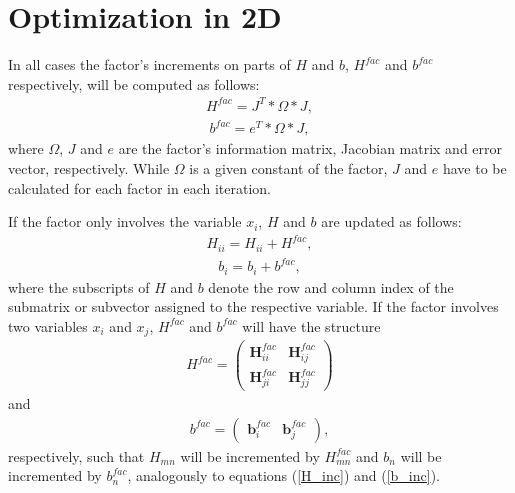\section{Optimization in 2D}



In all cases the factor's increments on parts of $H$ and $b$, $H^{fac}$ and $b^{fac}$ respectively, will be computed as follows:
\begin{align}
	H^{fac} = J^T * \Omega * J,
\end{align}
\begin{align}
	b^{fac} = e^T * \Omega * J,
\end{align}
where $\Omega$, $J$ and $e$ are the factor's information matrix, Jacobian matrix and error vector, respectively. While $\Omega$ is a given constant of the factor, $J$ and $e$ have to be calculated for each factor in each iteration.

If the factor only involves the variable $x_i$, $H$ and $b$ are updated as follows:
\begin{align}
\label{H_inc}
	H_{ii} = H_{ii} + H^{fac},
\end{align}
\begin{align}
\label{b_inc}
	b_i = b_i + b^{fac},
\end{align}
where the subscripts of $H$ and $b$ denote the row and column index of the submatrix or subvector assigned to the respective variable. If the factor involves two variables $x_i$ and $x_j$, $H^{fac}$ and $b^{fac}$ will have the structure
\begin{align}
H^{fac} =
\begin{pmatrix}
	\boldsymbol{H}^{fac}_{ii} & \boldsymbol{H}^{fac}_{ij}\\
	\boldsymbol{H}^{fac}_{ji} & \boldsymbol{H}^{fac}_{jj}
\end{pmatrix}
\end{align}
and
\begin{align}
b^{fac} =
\begin{pmatrix}
	\boldsymbol{b}^{fac}_{i} & \boldsymbol{b}^{fac}_{j}
\end{pmatrix},
\end{align}
respectively, such that $H_{mn}$ will be incremented by $H^{fac}_{mn}$ and $b_n$ will be incremented by $b^{fac}_n$, analogously to equations (\ref{H_inc}) and (\ref{b_inc}).

